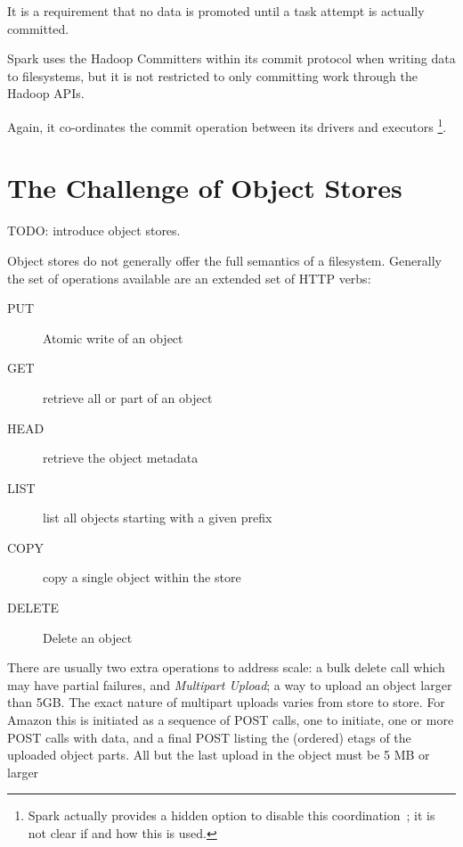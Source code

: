 \documentclass[conference]{IEEEtran}
\begin{document}
It is a requirement that no data is promoted until a task attempt is actually
committed.


Spark uses the Hadoop Committers within its commit protocol when
writing data to filesystems, but it is not restricted to only committing work
through the Hadoop APIs.

Again, it co-ordinates the commit operation between its drivers and executors
\footnote{Spark actually provides a hidden option to disable this
coordination\ \cite{SPARK-8029}; it is not clear if and how this is used.}.


\section{The Challenge of Object Stores}
\label{sec:object-stores}


TODO: introduce object stores.



Object stores do not generally offer the full semantics of a filesystem.
Generally the set of operations available are an extended set of HTTP verbs:

\begin{description}
  \item[PUT] Atomic write of an object
  \item[GET] retrieve all or part of an object
  \item[HEAD] retrieve the object metadata
  \item[LIST] list all objects starting with a given prefix
  \item[COPY] copy a single object within the store
  \item[DELETE] Delete an object
\end{description}

There are usually two extra operations to address scale:
 a bulk delete call which may have partial failures,
and \emph{Multipart Upload}; a way to upload an object larger than 5GB\@.
The exact nature of multipart uploads varies from store to store.
For Amazon this is initiated as a sequence of POST calls, one to initiate,
one or more POST calls with data, and a final POST listing the (ordered)
etags of the uploaded object parts.
All but the last upload in the object must be 5 MB or larger
\end{document}
